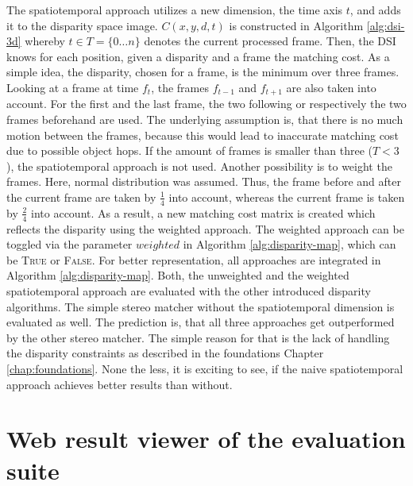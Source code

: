 \noindent The spatiotemporal approach utilizes a new dimension, the time axis $t$, and adds it to the disparity space image.
$C(x,y,d,t)$ is constructed in Algorithm \ref{alg:dsi-3d} whereby $t \in T=\{0{\dots}n\}$ denotes the current processed frame.
Then, the DSI knows for each position, given a disparity and a frame the matching cost.
\newline\newline\noindent As a simple idea, the disparity, chosen for a frame, is the minimum over three frames.
Looking at a frame at time $f_t$, the frames $f_{t-1}$ and $f_{t+1}$ are also taken into account.
For the first and the last frame, the two following or respectively the two frames beforehand are used.
The underlying assumption is, that there is no much motion between the frames, because this would lead to inaccurate matching cost due to possible object hops.
If the amount of frames is smaller than three ($T < 3$), the spatiotemporal approach is not used.
Another possibility is to weight the frames.
Here, normal distribution was assumed.
Thus, the frame before and after the current frame are taken by $\frac{1}{4}$ into account, whereas the current frame is taken by $\frac{2}{4}$ into account.
As a result, a new matching cost matrix is created which reflects the disparity using the weighted approach.
The weighted approach can be toggled via the parameter $weighted$ in Algorithm \ref{alg:disparity-map}, which can be \textsc{True} or \textsc{False}.
\newline\newline\noindent For better representation, all approaches are integrated in Algorithm \ref{alg:disparity-map}.
Both, the unweighted and the weighted spatiotemporal approach are evaluated with the other introduced disparity algorithms.
The simple stereo matcher without the spatiotemporal dimension is evaluated as well.
The prediction is, that all three approaches get outperformed by the other stereo matcher.
The simple reason for that is the lack of handling the disparity constraints as described in the foundations Chapter \ref{chap:foundations}.
None the less, it is exciting to see, if the naive spatiotemporal approach achieves better results than without.

\section{Web result viewer of the evaluation suite}

